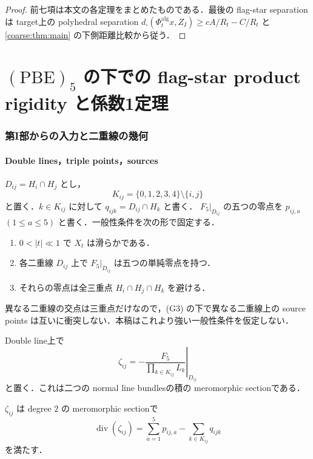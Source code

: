 \documentclass[a4paper,11pt]{ltjsarticle}
\numberwithin{equation}{section}
\theoremstyle{plain}
\theoremstyle{definition}
\theoremstyle{remark}
\begin{document}
\begin{proof}
前七項は本文の各定理をまとめたものである．最後の flag-star separation は target上の polyhedral separation
$d_\square(\Phi_t^{\mathrm{alg}}x,Z_I)\ge cA/R_t-C/R_t$ と \cref{coarse:thm:main} の下側距離比較から従う．
\end{proof}

\part{$\mathrm{(PBE)}_5$ の下での flag-star product rigidity と係数1定理}
\section{第I部からの入力と二重線の幾何}\label{sharp:sec:partI-input}

\subsection{Double lines，triple points，sources}

$D_{ij}=H_i\cap H_j$ とし，
\[
 K_{ij}=\{0,1,2,3,4\}\setminus\{i,j\}
\]
と置く．$k\in K_{ij}$ に対して $q_{ijk}=D_{ij}\cap H_k$ と書く．
$F_5|_{D_{ij}}$ の五つの零点を $p_{ij,a}$ $(1\le a\le5)$ と書く．一般性条件を次の形で固定する．
\begin{enumerate}[label=\textup{(G\arabic*)}]
\item $0<|t|\ll1$ で $X_t$ は滑らかである．
\item 各二重線 $D_{ij}$ 上で $F_5|_{D_{ij}}$ は五つの単純零点を持つ．
\item それらの零点は全三重点 $H_i\cap H_j\cap H_k$ を避ける．
\end{enumerate}
異なる二重線の交点は三重点だけなので，\textup{(G3)} の下で異なる二重線上の source points は互いに衝突しない．本稿はこれより強い一般性条件を仮定しない．

Double line上で
\begin{equation}\label{sharp:eq:zeta-def}
 \zeta_{ij}
 =-\left.\frac{F_5}{\prod_{k\in K_{ij}}L_k}\right|_{D_{ij}}
\end{equation}
と置く．これは二つの normal line bundlesの積の meromorphic sectionである．

\begin{proposition}\label{sharp:prop:relative-divisor}
$\zeta_{ij}$ は degree $2$ の meromorphic sectionで
\begin{equation}\label{sharp:eq:zeta-divisor}
 \operatorname{div}(\zeta_{ij})
 =\sum_{a=1}^5p_{ij,a}-\sum_{k\in K_{ij}}q_{ijk}
\end{equation}
を満たす．
\end{proposition}
\end{document}
